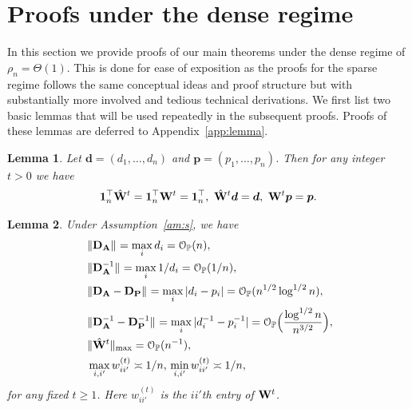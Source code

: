 \documentclass[10pt,journal,compsoc]{IEEEtran}
\newcommand{\op}{\mathcal{O}_{\mathbb{P}}}
\newcommand{\ee}{\end{aligned} \end{equation}}
\newcommand{\bds}{\boldsymbol}
\newtheorem{lemma}{Lemma}
\newcommand{\tp}{^\top}
\newcommand{\bee}{\begin{equation}\begin{aligned}}
\newcommand{\M}[1]{{{\mathbf{\MakeUppercase{#1}}}}}
\numberwithin{equation}{section}
\begin{document}
\renewcommand{\thetheorem}{\Alph{section}\arabic{theorem}}
\setcounter{theorem}{0}

\renewcommand{\theremark}{\Alph{section}\arabic{remark}}
\setcounter{remark}{0}

\makeatletter
{}
\makeatother

\section{Proofs under the dense regime}\label{app:densepf}
In this section we provide proofs of our main theorems under the dense regime of $\rho_n = \Theta(1)$. This is done for ease of exposition as the proofs for the sparse regime follows the same conceptual ideas and proof structure but with substantially more involved and tedious technical derivations.  
We first list two basic lemmas that will be used repeatedly in the subsequent proofs. Proofs of these lemmas are deferred to
Appendix~\ref{app:lemma}.
\begin{lemma}
  \label{l1}
Let $\bds d = (d_1,\dots,d_n)$ and $\bds p = (p_1,\dots,p_n)$. Then for any integer $t>0$ we have 
\bee
\M 1_{n}\tp \hat{\M W}^t  = \M 1_{n}\tp  {\M W}^t  = \M 1_{n}\tp, \,\, \hat{\M W}^t \bds{d} = \bds{d}, \,\, \M W^t \bds{p} = \bds{p}.
\ee
\end{lemma}

\begin{lemma}
  \label{l:dense:rate}
Under Assumption~\ref{am:s}, we have 
\begin{eqnarray}\nonumber
\ &\|\M D_{\M A}\|_{} = \max_{i} d_i = \op(n),
\\\nonumber
&\|\M D_{\M A}^{-1}\|_{} = \max_{i} 1/d_i = \op(1/n),
\\\label{l4:res:dp}
&\|\M D_{\M A} - \M D_{\M P}\|_{} = \max_{i}{|d_i - p_i|} = \op
                      (n^{1/2} \log^{1/2}{n}),
\\\nonumber
&\|\M D^{-1}_{\M A} - \M D^{-1}_{\M P}\|_{} = \max_{i}{|d_i^{-1} -
              p_i^{-1}|} = \op\Bigl(\frac{\log^{1/2}{n}}{n^{3/2}}\Bigr),
\\\nonumber
&\label{l4:res}
\|\hat{\M W}^{t}\|_{\max} = \op(n^{-1}),  
\\\nonumber
&\max_{i,{i'}} w^{(t)}_{ii'} \asymp 1/n, \, \min_{i,{i'}} w^{(t)}_{ii'} \asymp 1/n,
\end{eqnarray}
for any fixed $t \geq 1$. Here $w^{(t)}_{ii'}$ is the $ii'$th entry of $\M W^t$.
\end{lemma}
\end{document}
